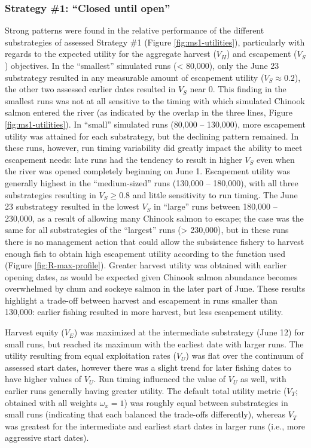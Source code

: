 \documentclass[12pt,]{book}
\theoremstyle{definition}
\theoremstyle{definition}
\theoremstyle{definition}
\theoremstyle{remark}
\begin{document}
\subsubsection{\texorpdfstring{Strategy \#1: ``Closed until
open''}{Strategy \#1: Closed until open}}\label{strategy-1-closed-until-open-1}

\noindent
Strong patterns were found in the relative performance of the different
substrategies of assessed Strategy \#1 (Figure \ref{fig:ms1-utilities}),
particularly with regards to the expected utility for the aggregate
harvest (\(V_H\)) and escapement (\(V_S\)) objectives. In the
``smallest'' simulated runs (\textless{} 80,000), only the June 23
substrategy resulted in any measurable amount of escapement utility
(\(V_S \approx 0.2\)), the other two assessed earlier dates resulted in
\(V_S\) near 0. This finding in the smallest runs was not at all
sensitive to the timing with which simulated Chinook salmon entered the
river (as indicated by the overlap in the three lines, Figure
\ref{fig:ms1-utilities}). In ``small'' simulated runs (80,000 --
130,000), more escapement utility was attained for each substrategy, but
the declining pattern remained. In these runs, however, run timing
variability did greatly impact the ability to meet escapement needs:
late runs had the tendency to result in higher \(V_S\) even when the
river was opened completely beginning on June 1. Escapement utility was
generally highest in the ``medium-sized'' runs (130,000 -- 180,000),
with all three substrategies resulting in \(V_S \geq 0.8\) and little
sensitivity to run timing. The June 23 substrategy resulted in the
lowest \(V_S\) in ``large'' runs between 180,000 -- 230,000, as a result
of allowing many Chinook salmon to escape; the case was the same for all
substrategies of the ``largest'' runs (\textgreater{} 230,000), but in
these runs there is no management action that could allow the
subsistence fishery to harvest enough fish to obtain high escapement
utility according to the function used (Figure \ref{fig:R-max-profile}).
Greater harvest utility was obtained with earlier opening dates, as
would be expected given Chinook salmon abundance becomes overwhelmed by
chum and sockeye salmon in the later part of June. These results
highlight a trade-off between harvest and escapement in runs smaller
than 130,000: earlier fishing resulted in more harvest, but less
escapement utility.

Harvest equity (\(V_E\)) was maximized at the intermediate substrategy
(June 12) for small runs, but reached its maximum with the earliest date
with larger runs. The utility resulting from equal exploitation rates
(\(V_U\)) was flat over the continuum of assessed start dates, however
there was a slight trend for later fishing dates to have higher values
of \(V_U\). Run timing influenced the value of \(V_U\) as well, with
earlier runs generally having greater utility. The default total utility
metric (\(V_T\); obtained with all weights \(\omega_x = 1\)) was roughly
equal between substrategies in small runs (indicating that each balanced
the trade-offs differently), whereas \(V_T\) was greatest for the
intermediate and earliest start dates in larger runs (i.e., more
aggressive start dates).
\end{document}
